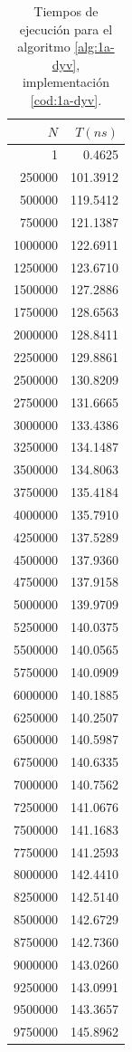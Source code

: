 \begin{table}
	\footnotesize
	\centering
	\begin{tabular}{|r|r|}
		\hline
		$N$ & $T (ns)$ \\
		\hline
		1 & 0.4625 \\ 
		250000 & 101.3912 \\ 
		500000 & 119.5412 \\ 
		750000 & 121.1387 \\ 
		1000000 & 122.6911 \\ 
		1250000 & 123.6710 \\ 
		1500000 & 127.2886 \\ 
		1750000 & 128.6563 \\ 
		2000000 & 128.8411 \\ 
		2250000 & 129.8861 \\ 
		2500000 & 130.8209 \\ 
		2750000 & 131.6665 \\ 
		3000000 & 133.4386 \\ 
		3250000 & 134.1487 \\ 
		3500000 & 134.8063 \\ 
		3750000 & 135.4184 \\ 
		4000000 & 135.7910 \\ 
		4250000 & 137.5289 \\ 
		4500000 & 137.9360 \\ 
		4750000 & 137.9158 \\ 
		5000000 & 139.9709 \\ 
		5250000 & 140.0375 \\ 
		5500000 & 140.0565 \\ 
		5750000 & 140.0909 \\ 
		6000000 & 140.1885 \\ 
		6250000 & 140.2507 \\ 
		6500000 & 140.5987 \\ 
		6750000 & 140.6335 \\ 
		7000000 & 140.7562 \\ 
		7250000 & 141.0676 \\ 
		7500000 & 141.1683 \\ 
		7750000 & 141.2593 \\ 
		8000000 & 142.4410 \\ 
		8250000 & 142.5140 \\ 
		8500000 & 142.6729 \\ 
		8750000 & 142.7360 \\ 
		9000000 & 143.0260 \\ 
		9250000 & 143.0991 \\ 
		9500000 & 143.3657 \\ 
		9750000 & 145.8962 \\
		\hline
	\end{tabular}

    \caption{Tiempos de ejecución para el algoritmo \ref{alg:1a-dyv}, implementación \ref{cod:1a-dyv}.}
    \label{tab:1a-dyv}
\end{table}

